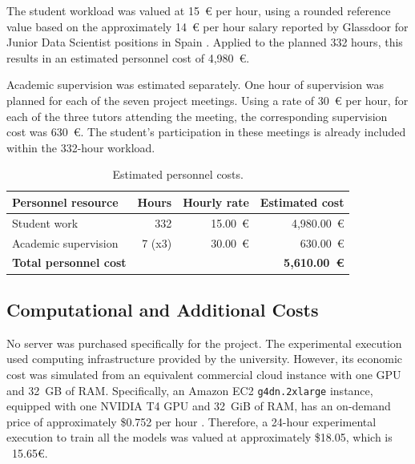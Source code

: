 The student workload was valued at 15~€ per hour, using a rounded reference value based on the approximately 14~€ per hour salary reported by Glassdoor for Junior Data Scientist positions in Spain \cite{glassdoor_junior_data_scientist_salary}. Applied to the planned 332 hours, this results in an estimated personnel cost of 4,980~€.

Academic supervision was estimated separately. One hour of supervision was planned for each of the seven project meetings. Using a rate of 30~€ per hour, for each of the three tutors attending the meeting, the corresponding supervision cost was 630~€. The student's participation in these meetings is already included within the 332-hour workload.

\begin{table}[htbp]
    \centering
    \caption{Estimated personnel costs.}
    \label{tab:personnel_costs}
    \renewcommand{\arraystretch}{1.15}
    \begin{tabular}{lrrr}
        \toprule
        \textbf{Personnel resource}
        & \textbf{Hours}
        & \textbf{Hourly rate}
        & \textbf{Estimated cost} \\
        \midrule
        Student work
            & 332 & 15.00~€ & 4,980.00~€ \\

        Academic supervision
            & 7 (x3) & 30.00~€ & 630.00~€ \\
        \midrule
        \textbf{Total personnel cost}
            & & & \textbf{5,610.00~€} \\
        \bottomrule
    \end{tabular}
\end{table}

\subsection{Computational and Additional Costs}
\label{subsec:computational_costs}

No server was purchased specifically for the project. The experimental execution used computing infrastructure provided by the university. However, its economic cost was simulated from an equivalent commercial cloud instance with one GPU and 32~GB of RAM. Specifically, an Amazon EC2 \texttt{g4dn.2xlarge} instance, equipped with one NVIDIA T4 GPU and 32~GiB of RAM, has an on-demand price of approximately \$0.752 per hour \cite{vantage_g4dn_2xlarge}. Therefore, a 24-hour experimental execution to train all the models was valued at approximately \$18.05, which is ~15.65€.

